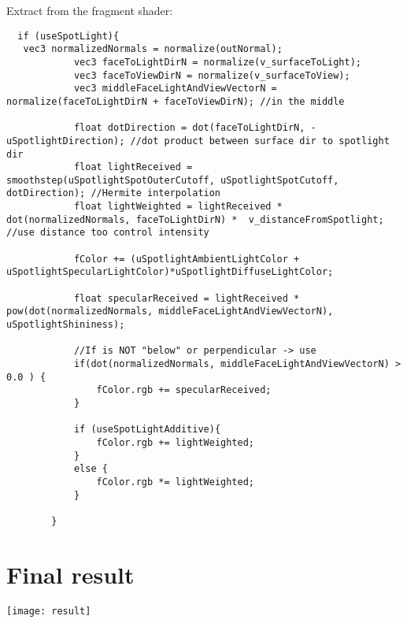 \documentclass[10pt,a4paper]{article}
\begin{document}
Extract from the fragment shader:
\begin{verbatim}
  if (useSpotLight){ 
   vec3 normalizedNormals = normalize(outNormal);
            vec3 faceToLightDirN = normalize(v_surfaceToLight);
            vec3 faceToViewDirN = normalize(v_surfaceToView);
            vec3 middleFaceLightAndViewVectorN = normalize(faceToLightDirN + faceToViewDirN); //in the middle

            float dotDirection = dot(faceToLightDirN, - uSpotlightDirection); //dot product between surface dir to spotlight dir
            float lightReceived = smoothstep(uSpotlightSpotOuterCutoff, uSpotlightSpotCutoff, dotDirection); //Hermite interpolation 
            float lightWeighted = lightReceived * dot(normalizedNormals, faceToLightDirN) *  v_distanceFromSpotlight; //use distance too control intensity
            
            fColor += (uSpotlightAmbientLightColor + uSpotlightSpecularLightColor)*uSpotlightDiffuseLightColor;

            float specularReceived = lightReceived * pow(dot(normalizedNormals, middleFaceLightAndViewVectorN), uSpotlightShininess);
          
            //If is NOT "below" or perpendicular -> use 
            if(dot(normalizedNormals, middleFaceLightAndViewVectorN) > 0.0 ) {
                fColor.rgb += specularReceived;
            }

            if (useSpotLightAdditive){
                fColor.rgb += lightWeighted;
            }
            else {
                fColor.rgb *= lightWeighted;
            }
    
        }
\end{verbatim}

\section{Final result}
\begin{center}
\texttt{[image: result]}
\end{center}
\end{document}

